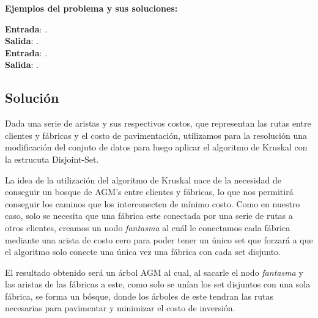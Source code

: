 \documentclass[a4paper, 10pt, twoside]{article}
\begin{document}
\textbf{Ejemplos del problema y sus soluciones:}

\textbf{Entrada}: . \\
\textbf{Salida}: . \\

\textbf{Entrada}: . \\
\textbf{Salida}: . \\

\subsection{Solución}

Dada una serie de aristas y sus respectivos costos, que representan las rutas entre clientes y fábricas y el costo de pavimentación, utilizamos para la resolución una modificación del conjuto de datos para luego aplicar el algoritmo de Kruskal con la estrucuta Disjoint-Set.

La idea de la utilización del algoritmo de Kruskal nace de la necesidad de conseguir un bosque de AGM's entre clientes y fábricas, lo que nos permitirá conseguir los caminos que los interconecten de mínimo costo. Como en nuestro caso, solo se necesita que una fábrica este conectada por una serie de rutas a otros clientes, creamos un nodo \textit{fantasma} al cuál le conectamos cada fábrica mediante una arista de costo cero para poder tener un único set que forzará a que el algoritmo solo conecte una única vez una fábrica con cada set disjunto.

El resultado obtenido será un árbol AGM al cual, al sacarle el nodo \textit{fantasma} y las aristas de las fábricas a este, como solo se unían los set disjuntos con una sola fábrica, se forma un bósque, donde los árboles de este tendran las rutas necesarias para pavimentar y minimizar el costo de inversión.
\end{document}

